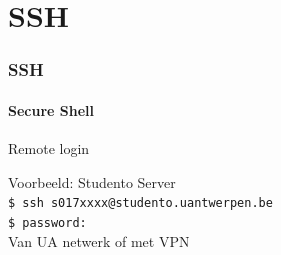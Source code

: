 
\section{SSH}
\begin{frame}
    \frametitle{SSH}
	\framesubtitle{\textbf{S}ecure \textbf{Sh}ell}
    
	Remote login \\
    
    \vspace{1cm}
    
    Voorbeeld: Studento Server \\
    \texttt{\$ ssh s017xxxx@studento.uantwerpen.be} \\
    \texttt{\$ password: } \\

	\vspace{1cm}
    Van UA netwerk of met VPN
\end{frame}

